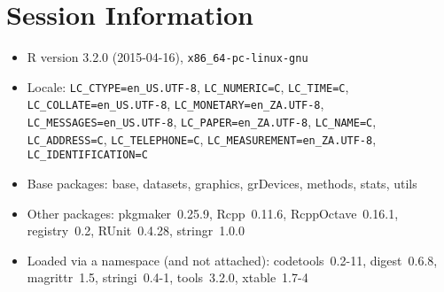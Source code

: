 \documentclass[10pt]{article}\usepackage[]{graphicx}\usepackage[]{color}
\begin{document}
\section*{Session Information}
\begin{itemize}\raggedright
  \item R version 3.2.0 (2015-04-16), \verb|x86_64-pc-linux-gnu|
  \item Locale: \verb|LC_CTYPE=en_US.UTF-8|, \verb|LC_NUMERIC=C|, \verb|LC_TIME=C|, \verb|LC_COLLATE=en_US.UTF-8|, \verb|LC_MONETARY=en_ZA.UTF-8|, \verb|LC_MESSAGES=en_US.UTF-8|, \verb|LC_PAPER=en_ZA.UTF-8|, \verb|LC_NAME=C|, \verb|LC_ADDRESS=C|, \verb|LC_TELEPHONE=C|, \verb|LC_MEASUREMENT=en_ZA.UTF-8|, \verb|LC_IDENTIFICATION=C|
  \item Base packages: base, datasets, graphics, grDevices, methods,
    stats, utils
  \item Other packages: pkgmaker~0.25.9, Rcpp~0.11.6,
    RcppOctave~0.16.1, registry~0.2, RUnit~0.4.28, stringr~1.0.0
  \item Loaded via a namespace (and not attached): codetools~0.2-11,
    digest~0.6.8, magrittr~1.5, stringi~0.4-1, tools~3.2.0,
    xtable~1.7-4
\end{itemize}
\end{document}
